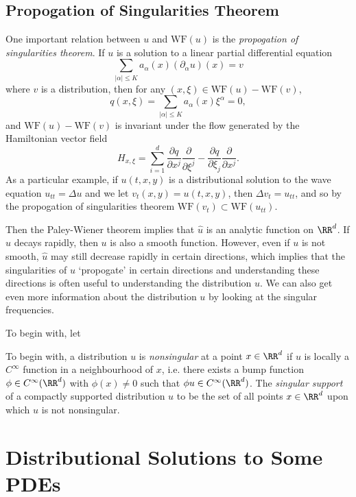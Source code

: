 \section{Propogation of Singularities Theorem}

One important relation between $u$ and $\text{WF}(u)$ is the \emph{propogation of singularities theorem}. If $u$ is a solution to a linear partial differential equation
%
\[ \sum_{|\alpha| \leq K} a_\alpha(x) (\partial_\alpha u)(x) = v \]
%
where $v$ is a distribution, then for any $(x,\xi) \in \text{WF}(u) - \text{WF}(v)$,
%
\[ q(x,\xi) = \sum_{|\alpha| \leq K} a_\alpha(x) \xi^\alpha = 0, \]
%
and $\text{WF}(u) - \text{WF}(v)$ is invariant under the flow generated by the Hamiltonian vector field
%
\[ H_{x,\xi} = \sum_{i = 1}^d \frac{\partial q}{\partial x^j} \frac{\partial}{\partial \xi^j} - \frac{\partial q}{\partial \xi_j} \frac{\partial}{\partial x^j}. \]
%
As a particular example, if $u(t,x,y)$ is a distributional solution to the wave equation $u_{tt} = \Delta u$ and we let $v_t(x,y) = u(t,x,y)$, then $\Delta v_t = u_{tt}$, and so by the propogation of singularities theorem $\text{WF}(v_t) \subset \text{WF}(u_{tt})$.

Then the Paley-Wiener theorem implies that $\widehat{u}$ is an analytic function on $\RR^d$. If $\widehat{u}$ decays rapidly, then $u$ is also a smooth function. However, even if $u$ is not smooth, $\widehat{u}$ may still decrease rapidly in certain directions, which implies that the singularities of $u$ `propogate' in certain directions and understanding these directions is often useful to understanding the distribution $u$. We can also get even more information about the distribution $u$ by looking at the singular frequencies.

To begin with, let 

To begin with, a distribution $u$ is \emph{nonsingular} at a point $x \in \RR^d$ if $u$ is locally a $C^\infty$ function in a neighbourhood of $x$, i.e. there exists a bump function $\phi \in C^\infty(\RR^d)$ with $\phi(x) \neq 0$ such that $\phi u \in C^\infty(\RR^d)$. The  \emph{singular support} of a compactly supported distribution $u$ to be the set of all points $x \in \RR^d$ upon which $u$ is not nonsingular.









\chapter{Distributional Solutions to Some PDEs}

